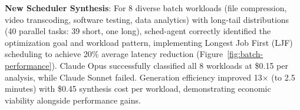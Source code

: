 \documentclass[preprint]{article}
\newcommand{\sys}{SchedCP\xspace}
\newcommand{\agent}{sched-agent\xspace}
\begin{document}
\textbf{New Scheduler Synthesis}: For 8 diverse batch workloads (file compression, video transcoding, software testing, data analytics) with long-tail distributions (40 parallel tasks: 39 short, one long), \agent correctly identified the optimization goal and workload pattern, implementing Longest Job First (LJF) scheduling to achieve 20\% average latency reduction (Figure~\ref{fig:batch-performance}). Claude Opus successfully classified all 8 workloads at \$0.15 per analysis, while Claude Sonnet failed. Generation efficiency improved 13× (to 2.5 minutes) with \$0.45 synthesis cost per workload, demonstrating economic viability alongside performance gains.






\end{document}
